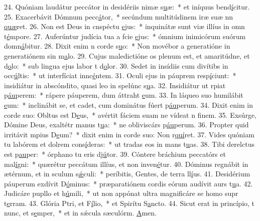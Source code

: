 24. Quóniam laudátur peccátor in desidériis nimæ s\uline{u}æ:~* et iníquus bend\uline{í}citur.
25. Exacerbávit Dómnum pecc\uline{á}tor,~* secúndum multitúdinem iræ suæ nn \uline{quæ}ret.
26. Non est Deus in cnspéctu \uline{e}jus:~* inquinátæ sunt viæ illíus in omn t\uline{é}mpore.
27. Auferúntur judícia tua a fcie \uline{e}jus:~* ómnium inimicórum suórum domn\uline{á}bitur.
28. Dixit enim n corde s\uline{u}o:~* Non movébor a generatióne in generatiónem sin m\uline{a}lo.
29. Cujus maledictióne os plenum est, et amaritúdne, et d\uline{o}lo:~* sub lingua ejus labor t d\uline{o}lor.
30. Sedet in insídiis cum divítibs in occ\uline{ú}ltis:~* ut interfíciat innc\uline{é}ntem.
31. Oculi ejus in páuprem resp\uline{í}ciunt:~* insidiátur in abscóndito, quasi leo in spelúnc s\uline{u}a.
32. Insidiátur ut rpiat p\uline{áu}perem:~* rápere páuperem, dum áttraht \uline{e}um.
33. In láqueo suo humilábit \uline{e}um:~* inclinábit se, et cadet, cum dominátus fúert p\uline{áu}perum.
34. Dixit enim in corde suo: Obltus est D\uline{e}us,~* avértit fáciem suam ne vídeat n f\uline{i}nem.
35. Exsúrge, Dómine Deus, exaltétr manus t\uline{u}a:~* ne obliviscárs p\uline{áu}perum.
36. Propter quid irritávit mpius D\uline{e}um?~* dixit enim in corde suo: Non r\uline{quí}ret.
37. Vides quóniam tu labórem et dolrem cons\uline{í}deras:~* ut tradas eos in mans t\uline{u}as.
38. Tibi derelctus est p\uline{au}per:~* órphano tu eris dj\uline{ú}tor.
39. Cóntere bráchium peccatórs et mal\uline{í}gni:~* quærétur peccátum illíus, et non inven\uline{é}tur.
40. Dóminus regnábit in ætérnum, et in sculum s\uline{ǽ}culi:~* períbitis, Gentes, de terra ll\uline{í}us.
41. Desidérium páuperum exdívit D\uline{ó}minus:~* præparatiónem cordis eórum audívit aurs t\uline{u}a.
42. Judicáre pupllo et h\uline{ú}mili,~* ut non appónat ultra magnificáre se homo supr t\uline{e}rram.
43. Glória Ptri, et F\uline{í}lio,~* et Spirítu S\uline{a}ncto.
44. Sicut erat in princípio, t nunc, et s\uline{e}mper,~* et in sǽcula sæculórm. \uline{A}men.
